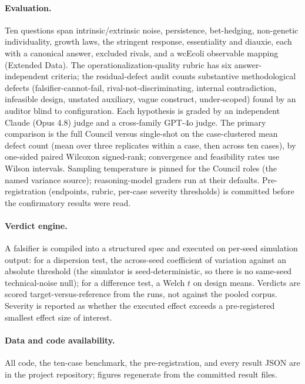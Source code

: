 \documentclass[11pt]{article}
\begin{document}
\paragraph{Evaluation.} Ten questions span intrinsic/extrinsic noise, persistence, bet-hedging, non-genetic
individuality, growth laws, the stringent response, essentiality and diauxie, each with a canonical answer,
excluded rivals, and a wcEcoli observable mapping (Extended Data). The operationalization-quality rubric has six
answer-independent criteria; the residual-defect audit counts substantive methodological defects
(falsifier-cannot-fail, rival-not-discriminating, internal contradiction, infeasible design, unstated auxiliary,
vague construct, under-scoped) found by an auditor blind to configuration. Each hypothesis is graded by an
independent Claude (Opus 4.8) judge and a cross-family GPT-4o judge. The primary comparison is the full Council
versus single-shot on the case-clustered mean defect count (mean over three replicates within a case, then
across ten cases), by one-sided paired Wilcoxon signed-rank; convergence and feasibility rates use Wilson
intervals. Sampling temperature is pinned for the Council roles (the named variance source); reasoning-model
graders run at their defaults. Pre-registration (endpoints, rubric, per-case severity thresholds) is committed
before the confirmatory results were read.

\paragraph{Verdict engine.} A falsifier is compiled into a structured spec and executed on per-seed simulation
output: for a dispersion test, the across-seed coefficient of variation against an absolute threshold (the
simulator is seed-deterministic, so there is no same-seed technical-noise null); for a difference test, a Welch
$t$ on design means. Verdicts are scored target-versus-reference from the runs, not against the pooled corpus.
Severity is reported as whether the executed effect exceeds a pre-registered smallest effect size of interest.

\paragraph{Data and code availability.} All code, the ten-case benchmark, the pre-registration, and every result
JSON are in the project repository; figures regenerate from the committed result files.
\end{document}
